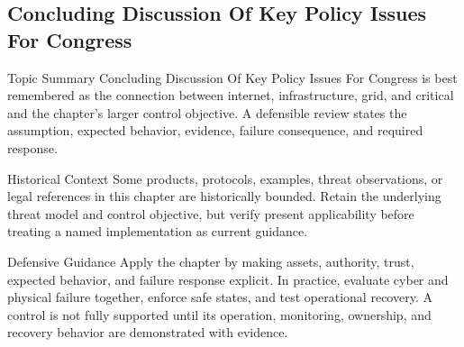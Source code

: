 \documentclass[11pt,letterpaper]{article}
\begin{document}
\subsection*{Concluding Discussion Of Key Policy Issues For Congress}
\begin{CornellNotesTable}
\end{CornellNotesTable}
\begin{CornellSummaryBox}{Topic Summary}
Concluding Discussion Of Key Policy Issues For Congress is best remembered as the connection between internet, infrastructure, grid, and critical and the chapter's larger control objective. A defensible review states the assumption, expected behavior, evidence, failure consequence, and required response.
\end{CornellSummaryBox}
\begin{CornellWarningBox}{Historical Context}
Some products, protocols, examples, threat observations, or legal references in this chapter are historically bounded. Retain the underlying threat model and control objective, but verify present applicability before treating a named implementation as current guidance.
\end{CornellWarningBox}
\begin{CornellOverviewBox}{Defensive Guidance}
Apply the chapter by making assets, authority, trust, expected behavior, and failure response explicit. In practice, evaluate cyber and physical failure together, enforce safe states, and test operational recovery. A control is not fully supported until its operation, monitoring, ownership, and recovery behavior are demonstrated with evidence.
\end{CornellOverviewBox}
\end{document}
